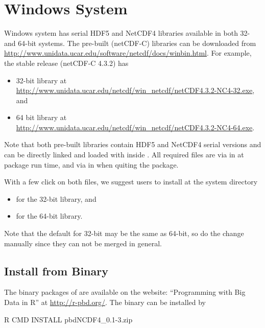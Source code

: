 
\section[Windows System]{Windows System}
\label{sec:windows_system}

Windows system has serial HDF5 and NetCDF4 libraries available in
both 32- and 64-bit systems. The pre-built (netCDF-C) libraries can be
downloaded from
\url{http://www.unidata.ucar.edu/software/netcdf/docs/winbin.html}.
For example, the stable release (netCDF-C 4.3.2) has
\begin{itemize}
\item 32-bit library at \\
\url{http://www.unidata.ucar.edu/netcdf/win_netcdf/netCDF4.3.2-NC4-32.exe}, and
\item 64 bit library at \\
\url{http://www.unidata.ucar.edu/netcdf/win_netcdf/netCDF4.3.2-NC4-64.exe}.
\end{itemize}
Note that both pre-built libraries contain HDF5 and NetCDF4 serial versions
and can be directly linked and loaded with  inside .
All required  files are via  in
 at package run time, and via  in
 when quiting the package.

With a few click on both  files,
we suggest users to install at the system directory
\begin{itemize}
\item
{} for the 32-bit library, and
\item
{} for the 64-bit library.
\end{itemize}
Note that the default for 32-bit may be the same as 64-bit, so do the change
manually since they can not be merged in general.


\subsection[Install from Binary]{Install from Binary}
\label{sec:install_from_binary}

The binary packages of  are available on the website:
``Programming with Big Data in R'' at
\url{http://r-pbd.org/}.
The binary can be installed by
\begin{Command}
R CMD INSTALL pbdNCDF4_0.1-3.zip
\end{Command}

